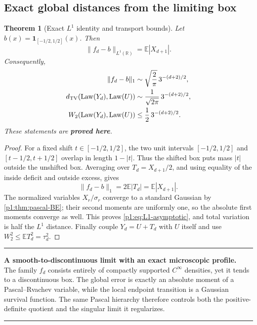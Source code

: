 \documentclass[11pt,oneside]{article}
\numberwithin{equation}{section}
\newtheorem{theorem}{Theorem}[section]
\theoremstyle{definition}
\theoremstyle{remark}
\newcommand{\R}{\mathbb R}
\newcommand{\E}{\mathbb E}
\newcommand{\Law}{\operatorname{Law}}
\newcommand{\statusproved}{\textcolor{deepgreen}{\textbf{proved here}}}
\newenvironment{resultbox}[1]{%
  \par\medskip\noindent\begin{center}\begin{minipage}{0.94\textwidth}%
  \color{deepgreen}\hrule\vspace{0.65em}%
  \color{black}\textbf{\color{deepgreen}#1.}\ }{%
  \par\vspace{0.65em}\color{deepgreen}\hrule
  \end{minipage}\end{center}\medskip}
\begin{document}
\subsection{Exact global distances from the limiting box}

\begin{theorem}[Exact $L^1$ identity and transport bounds]
\label{p1:thm:global-box-distance}
Let $b(x)=\mathbf1_{[-1/2,1/2]}(x)$.  Then
\begin{equation}
 \boxed{
 \|f_d-b\|_{L^1(\R)}
 =\E|X_{d+1}|.}
 \label{p1:eq:L1-exact}
\end{equation}
Consequently,
\begin{align}
 \|f_d-b\|_1
 &\sim\sqrt{\frac2\pi}\,3^{-(d+2)/2},
 \label{p1:eq:L1-asymptotic}\\
 d_{\rm TV}(\Law(Y_d),\Law(U))
 &\sim\frac1{\sqrt{2\pi}}\,3^{-(d+2)/2},
 \label{p1:eq:TV-asymptotic}\\
 W_2(\Law(Y_d),\Law(U))
 &\le\frac12\,3^{-(d+2)/2}.
 \label{p1:eq:W2-bound}
\end{align}
These statements are \statusproved.
\end{theorem}

\begin{proof}
For a fixed shift $t\in[-1/2,1/2]$, the two unit intervals
$[-1/2,1/2]$ and $[t-1/2,t+1/2]$ overlap in length $1-|t|$.  Thus the shifted box puts mass
$|t|$ outside the unshifted box.  Averaging over $T_d=X_{d+1}/2$, and using equality of the
inside deficit and outside excess, gives
\[
 \|f_d-b\|_1=2\E|T_d|=\E|X_{d+1}|.
\]
The normalized variables $X_r/\sigma_r$ converge to a standard Gaussian by
\cref{p1:thm:pascal-BE}; their second moments are uniformly one, so the absolute first moments
converge as well.  This proves \eqref{p1:eq:L1-asymptotic}, and total variation is half the
$L^1$ distance.  Finally couple $Y_d=U+T_d$ with $U$ itself and use
$W_2^2\le\E T_d^2=\tau_d^2$.
\end{proof}

\begin{resultbox}{A smooth-to-discontinuous limit with an exact microscopic profile}
The family $f_d$ consists entirely of compactly supported $C^\infty$ densities, yet it tends
to a discontinuous box.  The global error is exactly an absolute moment of a Pascal--Rvachev
variable, while the local endpoint transition is a Gaussian survival function.  The same
Pascal hierarchy therefore controls both the positive-definite quotient and the singular
limit it regularizes.
\end{resultbox}
\end{document}
